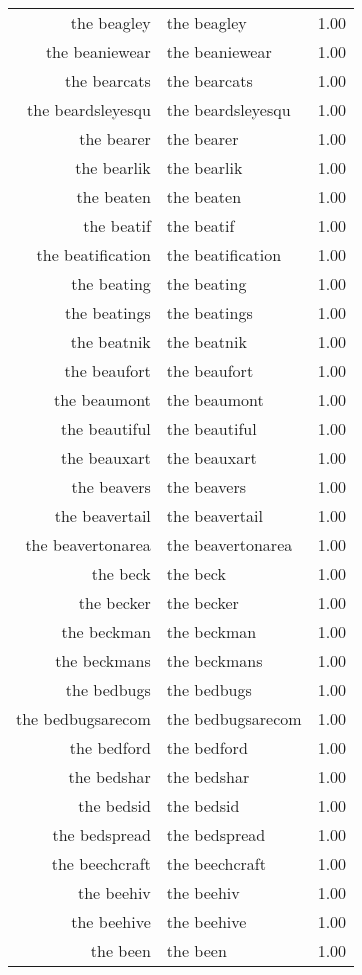 \begin{table}[ht]
\begin{tabular}{rlr}
  the beagley & the beagley & 1.00 \\ 
  the beaniewear & the beaniewear & 1.00 \\ 
  the bearcats & the bearcats & 1.00 \\ 
  the beardsleyesqu & the beardsleyesqu & 1.00 \\ 
  the bearer & the bearer & 1.00 \\ 
  the bearlik & the bearlik & 1.00 \\ 
  the beaten & the beaten & 1.00 \\ 
  the beatif & the beatif & 1.00 \\ 
  the beatification & the beatification & 1.00 \\ 
  the beating & the beating & 1.00 \\ 
  the beatings & the beatings & 1.00 \\ 
  the beatnik & the beatnik & 1.00 \\ 
  the beaufort & the beaufort & 1.00 \\ 
  the beaumont & the beaumont & 1.00 \\ 
  the beautiful & the beautiful & 1.00 \\ 
  the beauxart & the beauxart & 1.00 \\ 
  the beavers & the beavers & 1.00 \\ 
  the beavertail & the beavertail & 1.00 \\ 
  the beavertonarea & the beavertonarea & 1.00 \\ 
  the beck & the beck & 1.00 \\ 
  the becker & the becker & 1.00 \\ 
  the beckman & the beckman & 1.00 \\ 
  the beckmans & the beckmans & 1.00 \\ 
  the bedbugs & the bedbugs & 1.00 \\ 
  the bedbugsarecom & the bedbugsarecom & 1.00 \\ 
  the bedford & the bedford & 1.00 \\ 
  the bedshar & the bedshar & 1.00 \\ 
  the bedsid & the bedsid & 1.00 \\ 
  the bedspread & the bedspread & 1.00 \\ 
  the beechcraft & the beechcraft & 1.00 \\ 
  the beehiv & the beehiv & 1.00 \\ 
  the beehive & the beehive & 1.00 \\ 
  the been & the been & 1.00 \\ 

\end{tabular}
\end{table}
